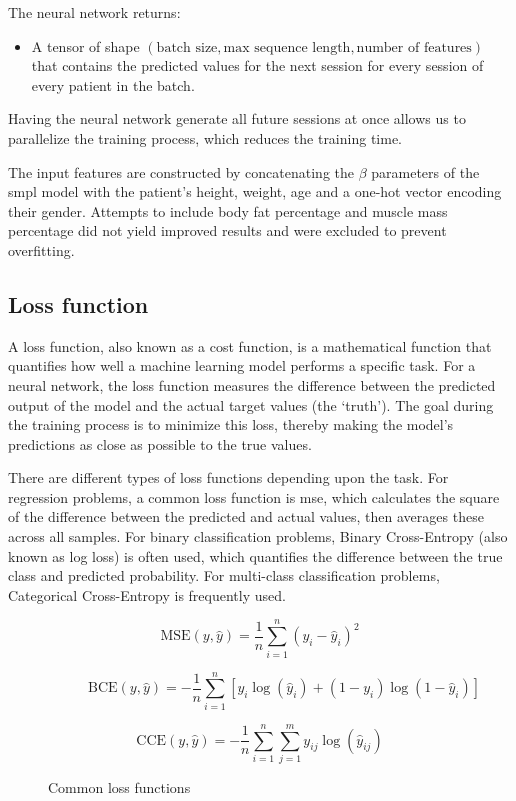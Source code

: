 The neural network returns:

\begin{itemize}
    \item A tensor of shape $(\text{batch size}, \text{max sequence length}, \text{number
                  of features})$ that contains the predicted values for the next session for
          every session of every patient in the batch.
\end{itemize}

Having the neural network generate all future sessions at once allows us to
parallelize the training process, which reduces the training time.

The input features are constructed by concatenating the $\beta$ parameters of
the \gls{smpl} model with the patient's height, weight, age and a one-hot
vector encoding their gender. Attempts to include body fat percentage and
muscle mass percentage did not yield improved results and were excluded to
prevent overfitting.

\subsection{Loss function}

A loss function, also known as a cost function, is a mathematical function that
quantifies how well a machine learning model performs a specific task. For a
neural network, the loss function measures the difference between the predicted
output of the model and the actual target values (the `truth'). The goal during
the training process is to minimize this loss, thereby making the model's
predictions as close as possible to the true values.

There are different types of loss functions depending upon the task. For
regression problems, a common loss function is \gls{mse}, which calculates the
square of the difference between the predicted and actual values, then averages
these across all samples. For binary classification problems, Binary
Cross-Entropy (also known as log loss) is often used, which quantifies the
difference between the true class and predicted probability. For multi-class
classification problems, Categorical Cross-Entropy is frequently used.

\begin{figure}[H]
    \begin{subfigure}{\textwidth}
        \[ \text{MSE}(y, \hat{y}) = \frac{1}{n} \sum_{i=1}^{n}(y_i - \hat{y}_i)^2 \]
    \end{subfigure}

    \begin{subfigure}{\textwidth}
        \[ \text{BCE}(y, \hat{y}) = -\frac{1}{n} \sum_{i=1}^{n} [y_i \log(\hat{y}_i) + (1 - y_i) \log(1 - \hat{y}_i)] \]
    \end{subfigure}

    \begin{subfigure}{\textwidth}
        \[ \text{CCE}(y, \hat{y}) = -\frac{1}{n} \sum_{i=1}^{n} \sum_{j=1}^{m} y_{ij} \log(\hat{y}_{ij}) \]
    \end{subfigure}
    \caption{Common loss functions}
\end{figure}

